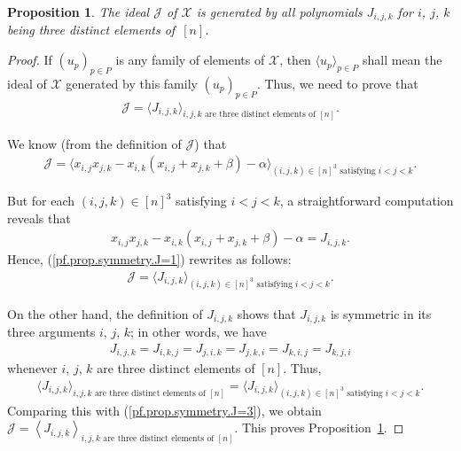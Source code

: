 \documentclass[pdftex]{sigma}
\newtheorem{Proposition}[Theorem]{Proposition}
\numberwithin{equation}{section}
\begin{document}
\begin{Proposition}\label{prop.symmetry}The ideal $\mathcal{J}$ of $\mathcal{X}$ is generated by all polynomials $J_{i,j,k}$ for $i$, $j$, $k$ being three distinct elements of~$[n] $.
\end{Proposition}

\begin{proof}If $(u_{p}) _{p\in P}$ is any family of elements of $\mathcal{X}$, then $ \langle u_{p} \rangle _{p\in P}$ shall mean the ideal of $\mathcal{X}$ generated by this family $ ( u_{p} ) _{p\in P}$. Thus, we need to prove that
\begin{gather*} \mathcal{J}= \langle J_{i,j,k} \rangle _{i,j,k\text{ are three distinct elements of }[n] }.\end{gather*}

We know (from the definition of $\mathcal{J}$) that
\begin{gather}
\mathcal{J}= \langle x_{i,j}x_{j,k}-x_{i,k} ( x_{i,j}+x_{j,k} +\beta ) -\alpha \rangle _{(i,j,k) \in [n ] ^{3}\text{ satisfying }i<j<k}. \label{pf.prop.symmetry.J=1}
\end{gather}

But for each $(i,j,k) \in[n] ^{3}$ satisfying $i<j<k$, a straightforward computation reveals that
\begin{gather*}
x_{i,j}x_{j,k}-x_{i,k} ( x_{i,j}+x_{j,k}+\beta ) -\alpha =J_{i,j,k}.
\end{gather*}
Hence, (\ref{pf.prop.symmetry.J=1}) rewrites as follows:
\begin{gather}
\mathcal{J}= \langle J_{i,j,k} \rangle _{(i,j,k) \in[n] ^{3}\text{ satisfying }i<j<k}. \label{pf.prop.symmetry.J=3}
\end{gather}

On the other hand, the definition of $J_{i,j,k}$ shows that $J_{i,j,k}$ is symmetric in its three arguments $i$, $j$, $k$; in other words, we have
\begin{gather*}
J_{i,j,k}=J_{i,k,j}=J_{j,i,k}=J_{j,k,i}=J_{k,i,j}=J_{k,j,i}
\end{gather*}
whenever $i$, $j$, $k$ are three distinct elements of $[n] $. Thus,
\begin{gather*}
 \langle J_{i,j,k} \rangle _{i,j,k\text{ are three distinct elements of }[n] }= \langle J_{i,j,k} \rangle _{(i,j,k) \in[n] ^{3}\text{ satisfying }i<j<k}.
\end{gather*}
Comparing this with (\ref{pf.prop.symmetry.J=3}), we obtain $\mathcal{J}=\left\langle J_{i,j,k}\right\rangle _{i,j,k\text{ are three distinct elements of }[n] }$. This proves Proposition~\ref{prop.symmetry}.
\end{proof}
\end{document}
